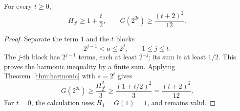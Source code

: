\begin{lemma}
\label{lem:harmonic-dyadic}
For every \(t\ge0\),
\[
 H_{2^t}\ge1+\frac t2,\qquad
 G(2^{2t})\ge\frac{(t+2)^2}{12}.
\]
\end{lemma}

\begin{proof}
Separate the term \(1\) and the \(t\) blocks
\[
 2^{j-1}<a\le2^j,\qquad 1\le j\le t.
\]
The \(j\)-th block has \(2^{j-1}\) terms, each at least \(2^{-j}\);
its sum is at least \(1/2\). This proves the harmonic inequality by a
finite sum. Applying Theorem~\ref{thm:harmonic} with \(s=2^t\)
gives
\[
 G(2^{2t})\ge\frac{H_{2^t}^2}{3}
 \ge\frac{(1+t/2)^2}{3}
 =\frac{(t+2)^2}{12}.
\]
For \(t=0\), the calculation uses \(H_1=G(1)=1\), and remains valid.
\end{proof}
